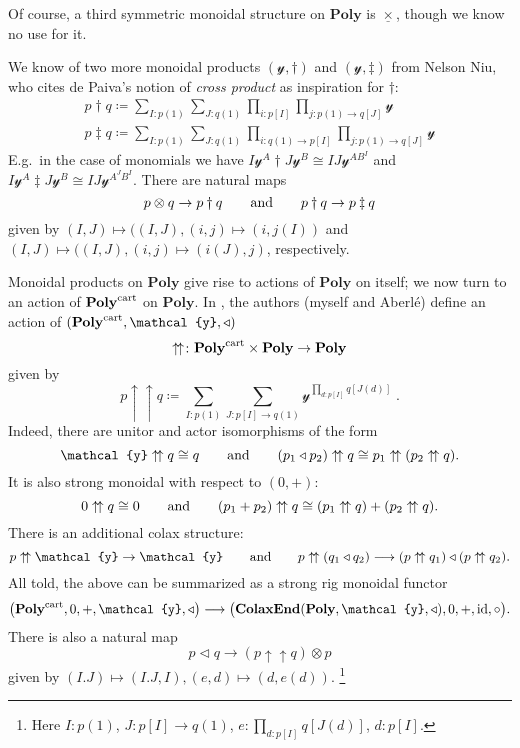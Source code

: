 \documentclass[11pt, one side, article]{memoir}
\theoremstyle{definition}
\theoremstyle{plain}
\newcommand{\Cat}[1]{\mathbf{#1}}%
\newcommand{\id}{\mathrm{id}}
\newcommand{\too}{\longrightarrow}
\newcommand{\tn}[1]{\textnormal{#1}}
\newcommand{\ul}[1]{\underline{#1}}
\newcommand{\yon}{{\mathcal{y}}}
\newcommand{\poly}{\Cat{Poly}}
\newcommand{\cart}{\tn{cart}}
\newcommand{\polycart}{\poly^\cart}
\newcommand{\0}{\textsf{0}}
\newcommand{\1}{\tn{\textsf{1}}}
\newcommand{\tri}{\mathbin{\triangleleft}}
\newcommand{\upup}{\uparrow\!\uparrow}
\newcommand{\hh}[2][]{#1 \tn{#2} #1}
\newcommand{\qqand}{\hh[\qquad]{and}}
\newcommand{\garner}[1]{\mathbin{\ul{#1}}}
\begin{document}
Of course, a third symmetric monoidal structure on $\poly$ is $\garner{\times}$, though we know no use for it.

We know of two more monoidal products $(\yon,\dagger)$ and $(\yon, \ddagger)$ from Nelson Niu, who cites de Paiva's notion of \emph{cross product} as inspiration for $\dagger$:
\begin{align}
	p\dagger q\coloneqq\sum_{I: p(1)}\sum_{J: q(1)}\prod_{i: p[I]}\prod_{j\colon p(1)\to q[J]}\yon\\
	p\ddagger q\coloneqq\sum_{I: p(1)}\sum_{J: q(1)}\prod_{i\colon q(1)\to p[I]}\prod_{j\colon p(1)\to q[J]}\yon
\end{align}
E.g.\ in the case of monomials we have $I\yon^A\dagger J\yon^B\cong IJ\yon^{AB^I}$ and $I\yon^A\ddagger J\yon^B\cong IJ\yon^{A^JB^I}$. There are natural maps
\begin{equation}
	p\otimes q\to p\dagger q
	\qqand
	p\dagger q\to p\ddagger q
\end{equation}
given by $(I,J)\mapsto ((I,J),(i,j)\mapsto(i,j(I))$ and $(I,J)\mapsto((I,J),(i,j)\mapsto(i(J),j)$, respectively.

\bigskip
Monoidal products on $\poly$ give rise to actions of $\poly$ on itself; we now turn to an action of $\polycart$ on $\poly$.
In \cite{aberle2024polynomial}, the authors (myself and Aberl\'e) define an action of $(\polycart,\yon,\tri)$
\begin{equation}
  \upup\colon\polycart\times\poly\to\poly
\end{equation}
given by
\begin{equation}\label{eqn.upup_formula}
  p\upup q\coloneqq\sum_{I:p(1)}\sum_{J\colon p[I]\to q(1)}\yon^{\prod_{d:p[I]}q[J(d)]}\;.
\end{equation}
Indeed, there are unitor and actor isomorphisms of the form
\begin{equation}
	\yon\upup q\cong q
	\qqand
	(p_1\tri p_2)\upup q\cong p_1\upup(p_2\upup q).
\end{equation}
It is also strong monoidal with respect to $(0,+)$:
\begin{equation}
	0\upup q\cong 0
	\qqand
	(p_1+p_2)\upup q\cong(p_1\upup q) + (p_2\upup q).
\end{equation}
There is an additional colax structure:
\begin{equation}
	p\upup\yon\to\yon
	\qqand
	p\upup(q_1\tri q_2)\too(p\upup q_1)\tri(p\upup q_2).
\end{equation}
All told, the above can be summarized as a strong rig monoidal functor
\begin{equation}\label{eqn.upup_summary}
\big(\polycart,0,+,\yon,\tri\big)\too\big(\Cat{ColaxEnd}(\poly,\yon,\tri),0,+,\id,\circ\big).
\end{equation}
There is also a natural map
\begin{equation}
	p\tri q\to(p\upup q)\otimes p
\end{equation}
given by $(I.J)\mapsto(I.J,I),(e,d)\mapsto(d,e(d))$.%
\footnote{Here $I:p(1)$, $J:p[I]\to q(1)$, $e:\prod_{d:p[I]}q[J(d)]$, $d:p[I]$.}
\end{document}
